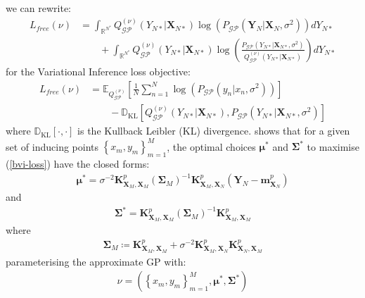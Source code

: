 \documentclass{article}
\newcommand{\KLD}{\operatorname{\mathbb{D}_{KL}}}
\newcommand{\GP}{\operatorname{\mathcal{GP}}}
\numberwithin{equation}{section}
\begin{document}
we can rewrite:
\begin{align}
    L_{free}(\nu) &= \int_{\mathbb{R}^{N^*}} Q^{(\nu)}_{\GP}(Y_{N*} \vert \mathbf{X}_{N*}) \log \left(P_{\GP}\left(\mathbf{Y}_N \vert \mathbf{X}_{N}, \sigma^2\right)\right) d Y_{N*} \nonumber
    \\ & \qquad + \int_{\mathbb{R}^{N^*}} Q^{(\nu)}_{\GP}(Y_{N*} \vert \mathbf{X}_{N*}) \log \left(\frac{P_{\GP}\left( Y_{N*} \vert \mathbf{X}_{N*}, \sigma^2\right) }{Q^{(\nu)}_{\GP}\left(Y_{N*} \vert \mathbf{X}_{N*}\right)}\right) d Y_{N*}
    \label{elbo-broken-down}
\end{align}
for the Variational Inference loss objective:
\begin{align}
    \label{bvi-loss}
    L_{free}(\nu) &=\mathbb{E}_{Q^{(\nu)}_{\GP}}\left[\frac{1}{N}\sum_{n=1}^N\log \left(P_{\GP}\left(y_n \vert x_n, \sigma^2\right)\right)\right] \nonumber \\
    & \qquad - \KLD \left[Q^{(\nu)}_{\GP}\left(Y_{N*} \vert \mathbf{X}_{N*}\right), P_{\GP}\left( Y_{N*} \vert \mathbf{X}_{N*}, \sigma^2\right) \right]
    \label{bvi-loss}
\end{align}
where $\KLD[\cdot, \cdot]$ is the Kullback Leibler (KL) divergence.
\cite{titsias2009variational} shows that for a given set of inducing points $\left\{ x_m, y_m\right\}_{m=1}^M$, the optimal choices $\boldsymbol{\mu}^*$ and $\mathbf{\Sigma}^*$ to maximise (\ref{bvi-loss}) have the closed forms:
\begin{align}
    \label{svgp-optimal-mean}
    \boldsymbol{\mu}^* = \sigma^{-2}\mathbf{K}^p_{\mathbf{X}_M, \mathbf{X}_M}  \left(\mathbf{\Sigma}_M\right)^{-1}\mathbf{K}^p_{\mathbf{X}_M, \mathbf{X}_N}  \left(\mathbf{Y}_N - \mathbf{m}^p_{\mathbf{X}_N}\right)
\end{align}
and
\begin{align}
    \label{svgp-optimal-covariance}
    \mathbf{\Sigma}^* = \mathbf{K}^p_{\mathbf{X}_M, \mathbf{X}_M}  \left(\mathbf{\Sigma}_M\right)^{-1}\mathbf{K}^p_{\mathbf{X}_M, \mathbf{X}_M} 
\end{align}
where 
\begin{align}
    \mathbf{\Sigma}_M \coloneqq \mathbf{K}^p_{\mathbf{X}_M, \mathbf{X}_M}  + \sigma^{-2}\mathbf{K}^p_{\mathbf{X}_M, \mathbf{X}_N} \mathbf{K}^p_{\mathbf{X}_N, \mathbf{X}_M} 
    \label{svgp-optimal-sigma-m}
\end{align}
parameterising the approximate GP with:
\begin{align}
    \nu = \left( \left\{ x_m, y_m\right\}_{m=1}^M, \boldsymbol{\mu}^*, \mathbf{\Sigma}^*\right)
    \label{titsias-svgp-parameters}
\end{align}
\end{document}

